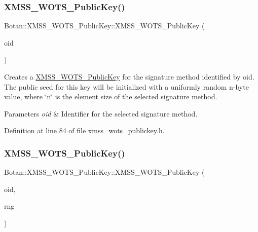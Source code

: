 \subsubsection{\texorpdfstring{X\+M\+S\+S\+\_\+\+W\+O\+T\+S\+\_\+\+Public\+Key()}{XMSS\_WOTS\_PublicKey()}\hspace{0.1cm}{\footnotesize\ttfamily [1/6]}}
{\footnotesize\ttfamily Botan\+::\+X\+M\+S\+S\+\_\+\+W\+O\+T\+S\+\_\+\+Public\+Key\+::\+X\+M\+S\+S\+\_\+\+W\+O\+T\+S\+\_\+\+Public\+Key (\begin{DoxyParamCaption}\item[{X\+M\+S\+S\+\_\+\+W\+O\+T\+S\+\_\+\+Parameters\+::ots\+\_\+algorithm\+\_\+t}]{oid }\end{DoxyParamCaption})\hspace{0.3cm}{\ttfamily [inline]}}

Creates a \mbox{\hyperlink{class_botan_1_1_x_m_s_s___w_o_t_s___public_key}{X\+M\+S\+S\+\_\+\+W\+O\+T\+S\+\_\+\+Public\+Key}} for the signature method identified by oid. The public seed for this key will be initialized with a uniformly random n-\/byte value, where \char`\"{}n\char`\"{} is the element size of the selected signature method.


\begin{DoxyParams}{Parameters}
{\em oid} & Identifier for the selected signature method. \\
\hline
\end{DoxyParams}


Definition at line 84 of file xmss\+\_\+wots\+\_\+publickey.\+h.

\mbox{\label{class_botan_1_1_x_m_s_s___w_o_t_s___public_key_a3fb0d9f974c41f2be8c5e14a0ad39403}} 
\subsubsection{\texorpdfstring{X\+M\+S\+S\+\_\+\+W\+O\+T\+S\+\_\+\+Public\+Key()}{XMSS\_WOTS\_PublicKey()}\hspace{0.1cm}{\footnotesize\ttfamily [2/6]}}
{\footnotesize\ttfamily Botan\+::\+X\+M\+S\+S\+\_\+\+W\+O\+T\+S\+\_\+\+Public\+Key\+::\+X\+M\+S\+S\+\_\+\+W\+O\+T\+S\+\_\+\+Public\+Key (\begin{DoxyParamCaption}\item[{X\+M\+S\+S\+\_\+\+W\+O\+T\+S\+\_\+\+Parameters\+::ots\+\_\+algorithm\+\_\+t}]{oid,  }\item[{Random\+Number\+Generator \&}]{rng }\end{DoxyParamCaption})\hspace{0.3cm}{\ttfamily [inline]}}

